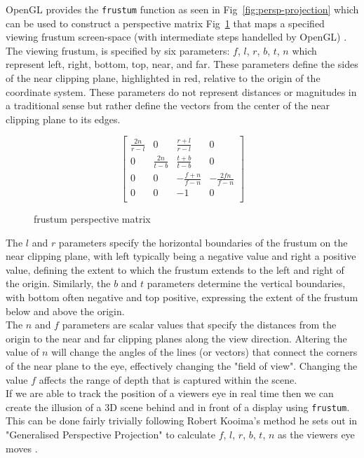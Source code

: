 OpenGL provides the \texttt{frustum} function as seen in Fig~\ref{fig:persp-projection} which can be used to construct a perspective matrix Fig~\ref{fig:perspective-matrix} that maps a specified viewing frustum  screen-space (with intermediate steps handelled by OpenGL) \tocite. The viewing frustum, is specified by six parameters: $f$, $l$, $r$, $b$, $t$, $n$ which represent left, right, bottom, top, near, and far. These parameters define the sides of the near clipping plane, highlighted in red, relative to the origin of the coordinate system. These parameters do not represent distances or magnitudes in a traditional sense but rather define the vectors from the center of the near clipping plane to its edges. \\

\begin{figure}[H]
\[
\begin{bmatrix}
\frac{2n}{r-l} & 0 & \frac{r+l}{r-l} & 0 \\
0 & \frac{2n}{t-b} & \frac{t+b}{t-b} & 0 \\
0 & 0 & -\frac{f+n}{f-n} & -\frac{2fn}{f-n} \\
0 & 0 & -1 & 0 \\
\end{bmatrix}
\]
\caption{frustum perspective matrix}
\label{fig:perspective-matrix}
\end{figure}

The $l$ and $r$ parameters specify the horizontal boundaries of the frustum on the near clipping plane, with left typically being a negative value and right a positive value, defining the extent to which the frustum extends to the left and right of the origin. Similarly, the $b$ and $t$ parameters determine the vertical boundaries, with bottom often negative and top positive, expressing the extent of the frustum below and above the origin. \\

The $n$ and $f$ parameters are scalar values that specify the distances from the origin to the near and far clipping planes along the view direction. Altering the value of $n$ will change the angles of the lines (or vectors) that connect the corners of the near plane to the eye, effectively changing the "field of view". Changing the value $f$ affects the range of depth that is captured within the scene. \\

If we are able to track the position of a viewers eye in real time then we can create the illusion of a 3D scene behind and in front of a display using \texttt{frustum}. This can be done fairly trivially following Robert Kooima's method he sets out in "Generalised Perspective Projection" to calculate $f$, $l$, $r$, $b$, $t$, $n$ as the viewers eye moves \cite{kooima2009generalized}. \\



